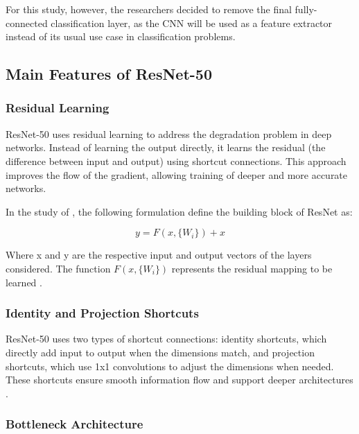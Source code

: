 \begin{refsection}
For this study, however, the researchers decided to remove the final fully-connected classification layer, as the CNN will be used as a feature extractor instead of its usual use case in classification problems.

\subsection{Main Features of ResNet-50}

\subsubsection{Residual Learning}

ResNet-50 uses residual learning to address the degradation problem in deep networks. Instead of learning the output directly, it learns the residual (the difference between input and output) using shortcut connections. This approach improves the flow of the gradient, allowing training of deeper and more accurate networks.

In the study of \citeauthor{he2015deepresiduallearningimage} \citeyear{he2015deepresiduallearningimage}, the following formulation define the building block of ResNet as:

\begin{equation}
y = F(x, \{W_i\}) + x
\label{eq:bbresnet}
\end{equation}

Where x and y are the respective input and output vectors of the layers considered. The function \(F(x, \{W_i\})\) represents the residual mapping to be learned \cite{he2015deepresiduallearningimage}.

\subsubsection{Identity and Projection Shortcuts}

ResNet-50 uses two types of shortcut connections: identity shortcuts, which directly add input to output when the dimensions match, and projection shortcuts, which use 1x1 convolutions to adjust the dimensions when needed. These shortcuts ensure smooth information flow and support deeper architectures \cite{he2015deepresiduallearningimage}.

\subsubsection{Bottleneck Architecture}


\end{refsection}
